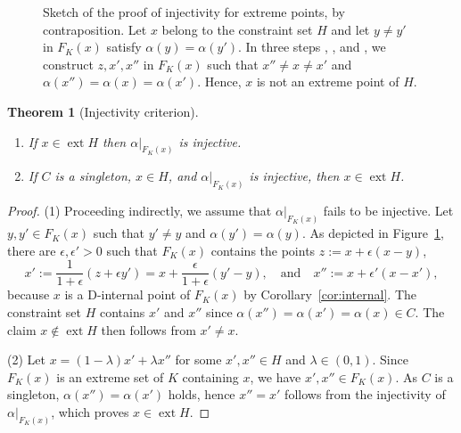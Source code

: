 \documentclass[a4paper,11pt,reqno]{amsart}
\newcommand\circled[1]{\tikz[baseline=(char.base)]{%
\node[shape=circle,draw,inner sep=2pt] (char) {#1};}}
\numberwithin{equation}{section}
\theoremstyle{plain}
\newtheorem{theorem}{Theorem}[section]
\theoremstyle{definition}
\DeclareMathOperator{\ext}{ext} %
\begin{document}
%
\begin{figure}
\hfill
{}
\hspace*{\fill}
\caption{\label{fig:thm-char-ext}%
Sketch of the proof of injectivity for extreme points, by contraposition.
Let $x$ belong to the constraint set $H$ and let $y\neq y'$ in $F_K(x)$
satisfy $\alpha(y)=\alpha(y')$. In three steps 
\protect\circled{1}, \protect\circled{2}, and \protect\circled{3}, we
construct $z,x',x''$ in $F_K(x)$ such that $x''\neq x\neq x'$ and 
$\alpha(x'')=\alpha(x)=\alpha(x')$. Hence, $x$ is not an extreme point 
of $H$.}
\end{figure}
%
\begin{theorem}[Injectivity criterion]\label{thm:ext}~
\begin{enumerate}
\item 
If $x\in\ext H$ then $\alpha|_{F_K(x)}$ is injective.
\item 
If $C$ is a singleton, $x\in H$, and $\alpha|_{F_K(x)}$ is injective, 
then $x\in\ext H$. 
\end{enumerate}
\end{theorem}
%
\begin{proof}
(1) Proceeding indirectly, we assume that $\alpha|_{F_K(x)}$ fails to be 
injective. Let $y,y'\in F_K(x)$ such that $y'\neq y$ and 
$\alpha(y')=\alpha(y)$. As depicted in Figure~\ref{fig:thm-char-ext}, there are 
$\epsilon,\epsilon'>0$ such that $F_K(x)$ contains the points 
$z:=x+\epsilon(x-y)$,
\[\textstyle
x':=\frac{1}{1+\epsilon}(z+\epsilon y')
=x+\frac{\epsilon}{1+\epsilon}(y'-y),
\quad\mbox{and}\quad
x'':=x+\epsilon'(x-x'),
\]
because $x$ is a D-internal point of $F_K(x)$ by Corollary~\ref{cor:internal}.
The constraint set $H$ contains $x'$ and $x''$ since 
$\alpha(x'')=\alpha(x')=\alpha(x)\in C$. The claim $x\not\in\ext H$ then 
follows from $x'\neq x$.
\par
%
(2) Let $x=(1-\lambda)x'+\lambda x''$ for some $x',x''\in H$ and $\lambda\in(0,1)$. 
Since $F_K(x)$ is an extreme set of $K$ containing $x$, we have $x',x''\in F_K(x)$. 
As $C$ is a singleton, $\alpha(x'')=\alpha(x')$ holds, hence $x''=x'$ follows from 
the injectivity of $\alpha|_{F_K(x)}$, which proves $x\in\ext H$.
\end{proof}
\end{document}
